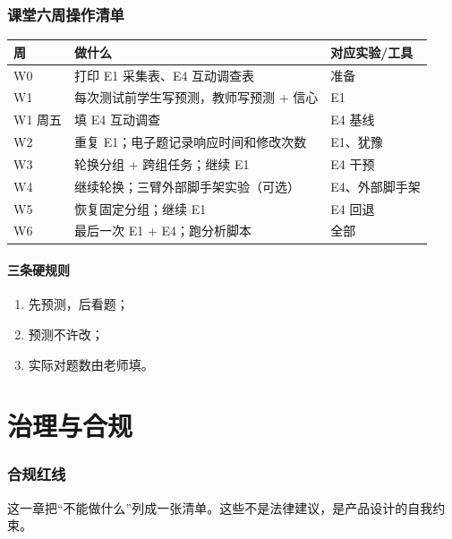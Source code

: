 \documentclass[UTF8,a4paper,11pt]{ctexart}
\begin{document}
\section{课堂六周操作清单}

\begin{center}
\begin{longtable}{@{}p{1.6cm}p{5.0cm}p{7.4cm}@{}}
\toprule
\textbf{周} & \textbf{做什么} & \textbf{对应实验/工具} \\
\midrule
W0 & 打印 E1 采集表、E4 互动调查表 & 准备 \\
W1 & 每次测试前学生写预测，教师写预测 + 信心 & E1 \\
W1 周五 & 填 E4 互动调查 & E4 基线 \\
W2 & 重复 E1；电子题记录响应时间和修改次数 & E1、犹豫 \\
W3 & 轮换分组 + 跨组任务；继续 E1 & E4 干预 \\
W4 & 继续轮换；三臂外部脚手架实验（可选） & E4、外部脚手架 \\
W5 & 恢复固定分组；继续 E1 & E4 回退 \\
W6 & 最后一次 E1 + E4；跑分析脚本 & 全部 \\
\bottomrule
\end{longtable}
\end{center}

\subsection{三条硬规则}

\begin{enumerate}[leftmargin=2em]
\item 先预测，后看题；
\item 预测不许改；
\item 实际对题数由老师填。
\end{enumerate}



\part{治理与合规}

\section{合规红线}

这一章把“不能做什么”列成一张清单。这些不是法律建议，是产品设计的自我约束。
\end{document}
